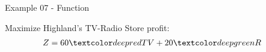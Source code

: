 \begin{frame}{Example 07 - Function}

Maximize Highland's TV-Radio Store profit:
\Huge{
\begin{align*}
    Z &= 60\colora{TV} + 20\colorb{R}
\end{align*}
}

\end{frame}
